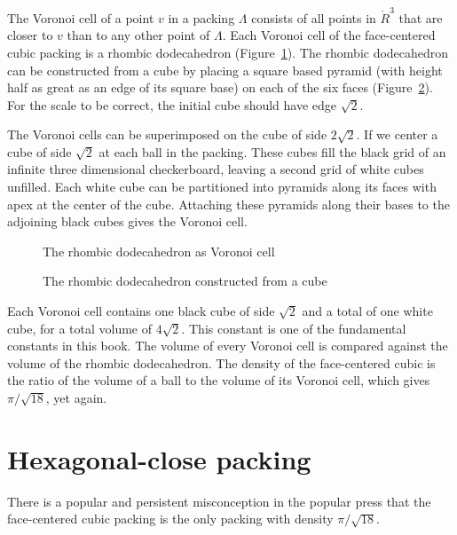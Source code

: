 The Voronoi cell of a point $v$ 
in a packing $\Lambda$ consists of
all points in $\ring{R}^3$ that are closer to $v$ than to any
other point of $\Lambda$.
Each Voronoi cell of the face-centered cubic
packing is a rhombic dodecahedron (Figure~\ref{fig:rhombic}).   %
The rhombic dodecahedron can be constructed from a cube by placing a
square based pyramid (with height half as great as an edge of its square
base) on each of the six faces (Figure~\ref{fig:rhombic-cube}).  %
For the scale to be correct, the
initial cube should have edge $\sqrt{2}$. 

The Voronoi cells can be superimposed on the cube of side $2\sqrt2$.  If we center
a cube of side $\sqrt2$ at each ball in the packing. These cubes fill
the black grid of an infinite three dimensional checkerboard,
leaving a second grid of white cubes unfilled.  Each
white cube can be partitioned into  pyramids along
its faces with apex at the center of the cube.  Attaching these pyramids
along their bases to the adjoining black cubes gives the Voronoi cell.

\begin{figure}[htb]
  \centering
  \caption{The rhombic dodecahedron as Voronoi cell}
  \label{fig:rhombic}
\end{figure}

\begin{figure}[htb]
  \centering
  \caption{The rhombic dodecahedron constructed from a cube}
  \label{fig:rhombic-cube}
\end{figure}

Each Voronoi cell contains one black cube of side $\sqrt2$ and a total
of one white cube, for a total volume of $4\sqrt2$.  This constant is one of the
fundamental constants in this book.  The volume of every Voronoi cell
is compared against the volume of the rhombic dodecahedron.
The density of the face-centered
cubic is the ratio of the volume of a ball to the volume of its Voronoi
cell, which gives $\pi/\sqrt{18}$, yet again.





\section{Hexagonal-close packing}

There
is a popular and persistent misconception in the popular press
that the face-centered cubic packing is the only packing with
density $\pi/\sqrt{18}$. 

